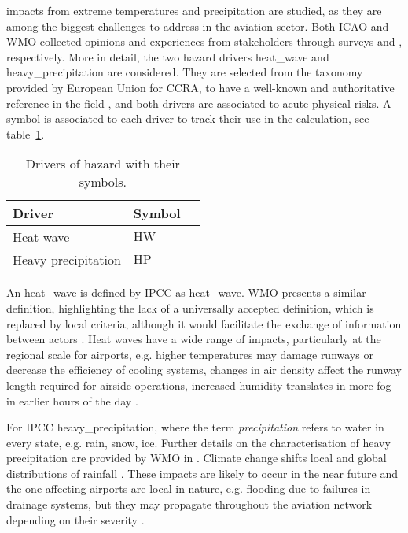 \Glspl{impact} from extreme temperatures and precipitation are studied, as they are among the biggest challenges to address in the aviation sector. Both \Gls{ICAO} and \gls{WMO} collected opinions and experiences from stakeholders through surveys \cite[62]{2018ICAOClimateAdaptation} and \cite[34]{2020WorldMeteorologicalOrganizationWMOOutcomesOf}, respectively.
More in detail, the two \gls{hazard} \glspl{driver} \gls{heat_wave} and \gls{heavy_precipitation} are considered. They are selected from the taxonomy provided by European Union for \gls{CCRA}, to have a well-known and authoritative reference in the field \cite[177]{2024EU20212139}, and both drivers are associated to acute physical risks. A symbol is associated to each \gls{driver} to track their use in the calculation, see table~\ref{tab:drivers_hazard}.
\begin{table}[h]
  \centering
  \caption{Drivers of hazard with their symbols.}
  \label{tab:drivers_hazard}
  \begin{tabular}{p{}ll}
    Driver              & Symbol        \\
    \hline
    Heat wave           & $\mathrm{HW}$ \\
    Heavy precipitation & $\mathrm{HP}$ \\
  \end{tabular}
\end{table}

An \gls{heat_wave} is defined by \gls{IPCC} as \glsdesc{heat_wave}. \Gls{WMO} presents a similar definition, highlighting the lack of a universally accepted definition, which is replaced by local criteria, although it would facilitate the exchange of information between actors \cite[5]{2023WorldMeteorologicalOrganizationWMOGuidelinesOn}. Heat waves have a wide range of impacts, particularly at the regional scale for airports, e.g. higher temperatures may damage runways or decrease the efficiency of cooling systems, changes in air density affect the runway length required for airside operations, increased humidity translates in more fog in earlier hours of the day \cite[23-28]{2018ICAOClimateAdaptation}.

For \gls{IPCC} \glsdesc{heavy_precipitation}, where the term \emph{precipitation} refers to water in every state, e.g. rain, snow, ice. Further details on the characterisation of heavy precipitation are provided by \gls{WMO} in \cite[6-7]{2023WorldMeteorologicalOrganizationWMOGuidelinesOn}. Climate change shifts local and global distributions of rainfall \cite[1605]{2021SeneviratneWeatherAnd}. These impacts are likely to occur in the near future and the one affecting airports are local in nature, e.g. flooding due to failures in drainage systems, but they may propagate throughout the aviation network depending on their severity \cite[28-34]{2018ICAOClimateAdaptation}.

